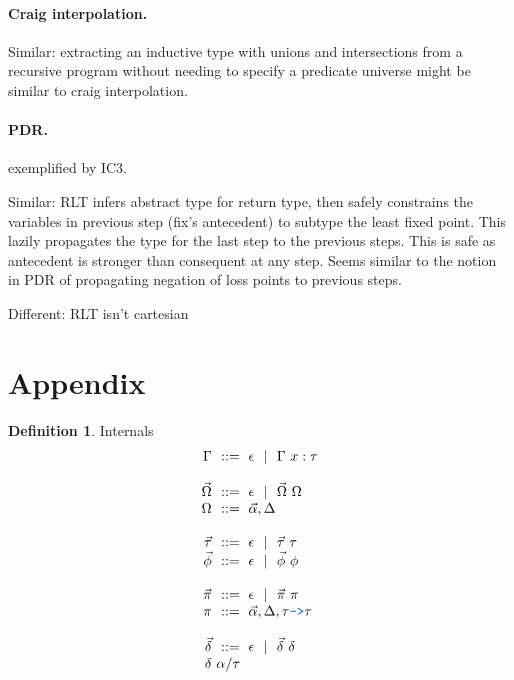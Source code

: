 \documentclass[acmsmall]{acmart}
\theoremstyle{definition}
\newtheorem{definition}{Definition}[section]
\begin{document}
\paragraph{Craig interpolation.} 
Similar: extracting an inductive type with unions and intersections 
from a recursive program without needing to specify a predicate universe might be similar to
craig interpolation.

\paragraph{PDR.}
exemplified by IC3. 

Similar: RLT infers abstract type for return type, 
then safely constrains the variables in previous step (fix's antecedent) 
to subtype the least fixed point.
This lazily propagates the type for the last step to the previous steps.
This is safe as antecedent is stronger than consequent at any step.
Seems similar to the notion in PDR of propagating negation of loss points to previous steps. 

Different: RLT isn't cartesian





\section{Appendix}

\begin{definition} Internals 
  \label{definition:internals}
  \[\begin{array}[t]{r@{}l}
    \nonterm{\Gamma} & \is \epsilon \sep \Gamma\ x : \tau
    \\
    \\
    \nonterm{\vec{\Omega}} & \is \epsilon \sep \vec{\Omega}\ \Omega
    \\
    \nonterm{\Omega} & \is \vec{\alpha}, \Delta
    \\
    \\
    \nonterm{\vec{\tau}} & \is \epsilon \sep \vec{\tau}\ \tau
    \\
    \nonterm{\vec{\phi}} & \is \epsilon \sep \vec{\phi}\ \phi
    \\
    \\
    \nonterm{\vec{\pi}} & \is \epsilon \sep \vec{\pi}\ \pi
    \\
    \nonterm{\pi} & \is \vec{\alpha}, \Delta, \tau \obj{->} \tau
    \\
    \\
    \nonterm{\vec{\delta}} & \is \epsilon \sep \vec{\delta}\ \delta
    \\
    \nonterm{\delta} & \alpha \slash \tau
  \end{array}\]
\end{definition}
\end{document}

